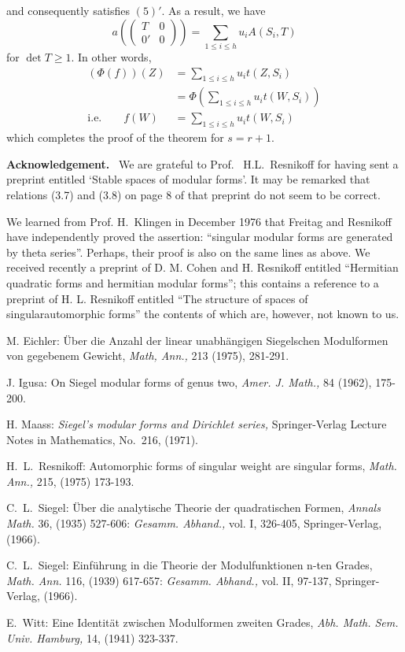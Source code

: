 and consequently satisfies $(5)'$. As a result, we have 
$$
a\left(
\begin{pmatrix}
T & 0\\
0' & 0
\end{pmatrix}
\right)
=\sum_{1\leq i\leq h}u_{i}A(S_{i},T)
$$
for $\det T\geq 1$. In other words,
\begin{align*}
(\Phi(f))(Z) &= \sum_{1\leq i\leq h}u_{i}t(Z,S_{i})\\
&=\Phi\left(\sum\limits_{1\leq i\leq h}u_{i}t(W,S_{i})\right)\\
\text{i.e.}\qquad f(W) &= \sum_{1\leq i\leq h}u_{i}t(W,S_{i})
\end{align*}
which completes the proof of the theorem for $s=r+1$.

\medskip
\noindent
{\bf Acknowledgement.}~
We are grateful to Prof.~ H.L.~Resnikoff for having sent a preprint
entitled `Stable spaces of modular forms'. It may be remarked that
relations (3.7) and (3.8) on page 8 of that preprint do not seem to be
correct. 

We learned from Prof. H.~Klingen in December 1976 that Freitag and
Resnikoff have independently proved the assertion: ``singular modular
forms are generated by theta series''. Perhaps, their proof is also on
the same lines as above. We received recently a preprint of
D. M. Cohen and H. Resnikoff entitled ``Hermitian quadratic forms and
hermitian modular forms''; this contains a reference to a preprint of
H. L. Resnikoff entitled ``The structure of spaces of
singular\pageoriginale automorphic forms'' the contents of which are,
however, not known to us.

\begin{thebibliography}{}
 M. Eichler: \"Uber die Anzahl der linear
unabh\"angigen Siegelschen Modulformen von gegebenem Gewicht, {\em
Math, Ann.,} 213 (1975), 281-291.

 J. Igusa: On Siegel modular forms of genus two,
{\em Amer. J. Math.,} 84 (1962), 175-200.

 H. Maass: {\em Siegel's modular forms and
Dirichlet series,} Springer-Verlag Lecture Notes in Mathematics,
No.~216, (1971).

 H.~L.~Resnikoff: Automorphic forms of singular
weight are singular forms, {\em Math. Ann.,} 215, (1975) 173-193.

 C.~L.~Siegel: \"Uber die analytische Theorie der
quadratischen Formen, {\em Annals Math.} 36, (1935) 527-606: {\em
Gesamm. Abhand.,} vol. I, 326-405, Springer-Verlag, (1966).

 C.~L.~Siegel: Einf\"uhrung in die Theorie der
Modulfunktionen n-ten Grades, {\em Math. Ann.} 116, (1939) 617-657:
{\em Gesamm. Abhand.,} vol. II, 97-137, Springer-Verlag, (1966).

 E.~Witt: Eine Identit\"at zwischen Modulformen
zweiten Grades, {\em Abh. Math. Sem. Univ. Hamburg,} 14, (1941)
323-337. 
\end{thebibliography}

\vfill\eject
~\phantom{a}
\thispagestyle{empty}

